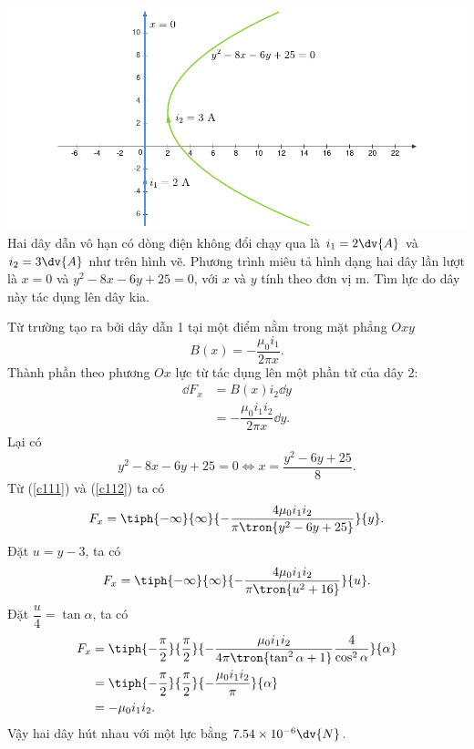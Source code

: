     \begin{vd}
    \includegraphics[width=\textwidth]{Anh/c1.pdf}\\
    Hai dây dẫn vô hạn có dòng điện không đổi chạy qua là $i_1=2\dv{A}$ và $i_2=3\dv{A}$ như trên hình vẽ. Phương trình miêu tả hình dạng hai dây lần lượt là $x=0$ và $y^2-8x-6y+25=0$, với $x$ và $y$ tính theo đơn vị $\mathrm{m}$. Tìm lực do dây này tác dụng lên dây kia.
    \end{vd}
    \begin{loigiai}
    Từ trường tạo ra bởi dây dẫn 1 tại một điểm nằm trong mặt phẳng $Oxy$
    $$B(x)=-\dfrac{\mu_0i_1}{2\pi x}.$$
    Thành phần theo phương $Ox$ lực từ tác dụng lên một phần tử của dây 2:
    \[\begin{aligned}
             \dd F_x&=B(x)i_2\dd y\\
             &=-\dfrac{\mu_0i_1i_2}{2\pi x}\dd y.
        \end{aligned}\tag{1} \label{c111}\]
    Lại có 
    \[ y^2-8x-6y+25=0\Leftrightarrow x=\dfrac{y^2-6y+25}{8} \tag{2} \label{c112}.\]
    Từ (\ref{c111}) và (\ref{c112}) ta có
    \begin{equation*}
             F_x=\tiph{-\infty}{\infty}{-\dfrac{4\mu_0i_1i_2}{\pi\tron{y^2-6y+25}}}{y}.
    \end{equation*}
    Đặt $u=y-3$, ta có
    \begin{equation*}
             F_x=\tiph{-\infty}{\infty}{-\dfrac{4\mu_0i_1i_2}{\pi\tron{u^2+16}}}{u}.
    \end{equation*}
    Đặt $\dfrac{u}{4}=\tan\alpha$, ta có
    \begin{equation*}
        \begin{aligned}
             F_x&=\tiph{-\frac{\pi}{2}}{\frac{\pi}{2}}{-\dfrac{\mu_0i_1i_2}{4\pi\tron{\tan^2\alpha+1}}\dfrac{4}{\cos^2\alpha}}{\alpha}\\
             &=\tiph{-\frac{\pi}{2}}{\frac{\pi}{2}}{-\dfrac{\mu_0i_1i_2}{\pi}}{\alpha}\\
             &=-\mu_0i_1i_2.
        \end{aligned}
    \end{equation*}
    Vậy hai dây hút nhau với một lực bằng $7.54\times10^{-6}\dv{N}$.
    \end{loigiai}
    
